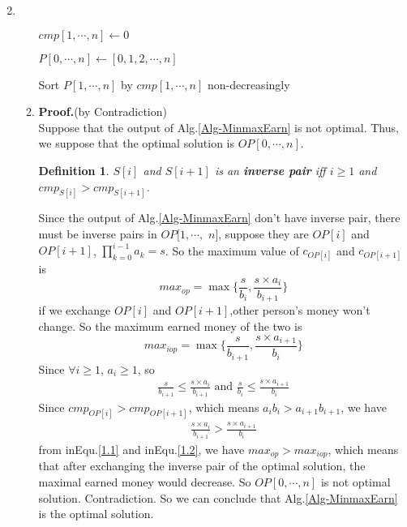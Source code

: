 \documentclass[12pt,a4paper]{article}
\makeatletter
\newtheorem*{solution}{Solution}
\newtheorem{definition}{Definition}
\theoremstyle{definition}
\renewenvironment{solution}[1][Solution] {\par\pushQED{\qed}\normalfont\topsep6\p@\@plus6\p@\relax\trivlist\item[\hskip\labelsep\bfseries#1\@addpunct{.}]\ignorespaces}{\popQED\endtrivlist\@endpefalse} \makeatother
\makeatother
\begin{document}
\begin{enumerate}
\begin{solution}
\begin{enumerate}
\begin{minipage}[t]{0.85\textwidth}
\begin{algorithm}[H]
        			$cmp[1,\cdots,n] \leftarrow 0$\;
        			
        			$P[0,\cdots,n] \leftarrow [0,1,2,\cdots,n]$\;
        			
        			
        			Sort $P[1,\cdots,n]$ by $ cmp[1,\cdots,n] $ non-decreasingly\;
        			
        			\;
        			
        		\end{algorithm}
        	\end{minipage}
        \item
       	\textbf{Proof.}(by Contradiction)\\
       	Suppose that the output of Alg.\ref{Alg-MinmaxEarn} is not optimal. Thus, we suppose that the optimal solution is $OP[0,\cdots,n]$.
       	\begin{definition}
       		 $ S[i] $  and  $ S[i+1] $ is an \textbf{inverse pair} iff $ i \geq 1 $ and $ cmp_{S[i]} > cmp_{S[i+1]} $. 
       	\end{definition}
        Since the output of Alg.\ref{Alg-MinmaxEarn} don't have inverse pair, there must be inverse pairs in $OP[1,\cdots,$ $n]$, suppose they are $ OP[i]$ and $ OP[i+1] $, $\prod_{k = 0}^{i-1} a_{k} = s$. So the maximum value of $c_{OP[i]} $ and $ c_{OP[i+1]} $ is
        $$ max_{op} = \max \{\frac{s}{b_i}, \frac{s\times a_{i}}{b_{i+1}}\}$$
        if we exchange $ OP[i]$ and $ OP[i+1] $,other person's money won't change. So the maximum earned money of the two is
        $$ max_{iop} = \max \{\frac{s}{b_{i+1}}, \frac{s\times a_{i+1}}{b_{i}}\} $$
        Since $ \forall i \geq 1 $, $ a_i \geq 1 $, so
        \begin{align}\label{1.1}
        	\frac{s}{b_{i+1}} \leq \frac{s\times a_{i}}{b_{i+1}}\text{ and } \frac{s}{b_i} \leq  \frac{s\times a_{i+1}}{b_{i}} 
        \end{align}
        Since $ cmp_{OP[i]} > cmp_{OP[i+1]} $, which means $ a_{i}b_{i} > a_{i+1}b_{i+1} $, we have
        \begin{align}\label{1.2}
        	\frac{s\times a_{i}}{b_{i+1}} > \frac{s\times a_{i+1}}{b_{i}} 
        \end{align}
        from inEqu.\ref{1.1} and inEqu.\ref{1.2}, we have $ max_{op} > max_{iop} $,
        which means that after exchanging the inverse pair of the optimal solution, the maximal earned money would decrease. So $OP[0,\cdots,n]$ is not optimal solution. Contradiction.
        So we can conclude that Alg.\ref{Alg-MinmaxEarn} is the optimal solution.
        \end{enumerate}
    \end{solution}


\end{enumerate}
\end{document}
